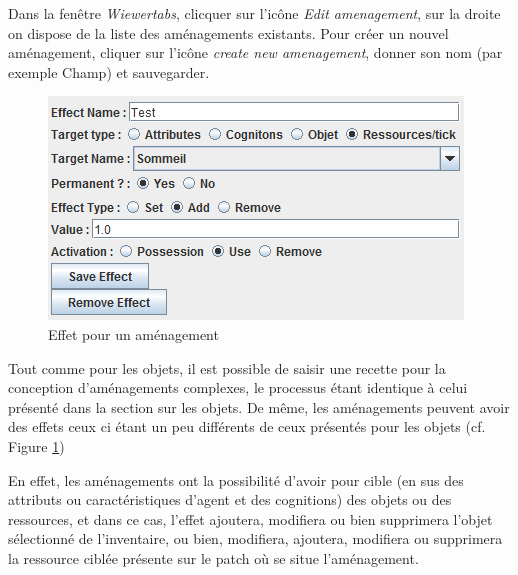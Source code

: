 Dans la fenêtre \textit{Wiewertabs}, clicquer sur l'icône \textit{Edit amenagement}, sur la droite on dispose de la liste des aménagements existants.
Pour créer un nouvel aménagement, cliquer sur l'icône \textit{create new amenagement}, donner son nom (par exemple Champ) et sauvegarder.

\begin{figure}[!h]
	\begin{center}
	\includegraphics[scale=0.6]{DocumentationSimulation/images/effetsA.png}
	\caption[EFA]{Effet pour un aménagement \\}
	\label{EFA}
	\end{center}
	\end{figure}

 Tout comme pour les objets,  il est possible de saisir une recette pour la conception d'aménagements complexes, le processus étant identique à celui présenté dans la section sur les objets.
 De même, les aménagements peuvent avoir des effets ceux ci étant un peu différents de ceux présentés pour les objets (cf. Figure \ref{EFA})
 
 En effet,  les aménagements  ont la possibilité d'avoir pour cible (en sus des attributs ou caractéristiques d'agent et des cognitions)  des objets ou des ressources, et dans ce cas, l'effet ajoutera, modifiera ou bien supprimera l'objet sélectionné de l'inventaire, ou bien, modifiera, ajoutera, modifiera ou supprimera la ressource ciblée présente sur le patch où se situe l'aménagement.